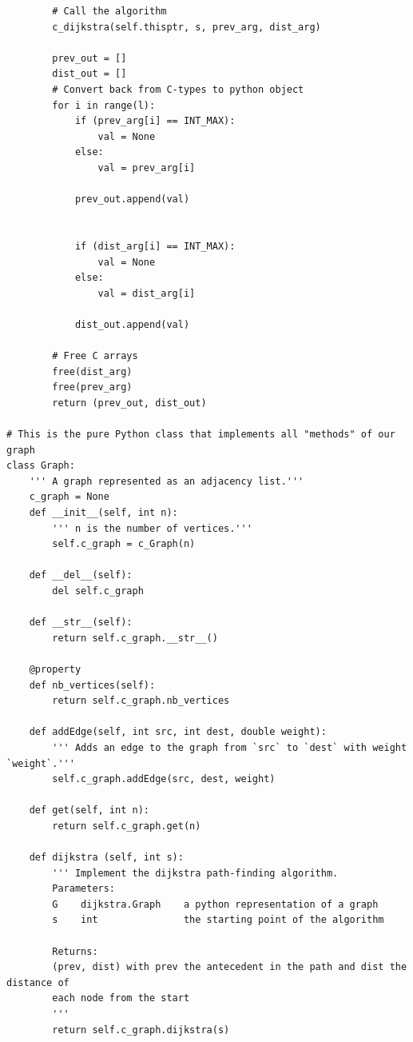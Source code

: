 \documentclass{article}
\begin{document}
\begin{verbatim}
        # Call the algorithm
        c_dijkstra(self.thisptr, s, prev_arg, dist_arg)

        prev_out = []
        dist_out = []
        # Convert back from C-types to python object
        for i in range(l):
            if (prev_arg[i] == INT_MAX):
                val = None
            else:
                val = prev_arg[i]
                
            prev_out.append(val)

            
            if (dist_arg[i] == INT_MAX):
                val = None
            else:
                val = dist_arg[i]
                
            dist_out.append(val)

        # Free C arrays
        free(dist_arg)
        free(prev_arg)
        return (prev_out, dist_out)

# This is the pure Python class that implements all "methods" of our graph
class Graph:
    ''' A graph represented as an adjacency list.'''
    c_graph = None
    def __init__(self, int n):
        ''' n is the number of vertices.'''
        self.c_graph = c_Graph(n)
        
    def __del__(self):
        del self.c_graph
        
    def __str__(self):
        return self.c_graph.__str__()
    
    @property
    def nb_vertices(self):
        return self.c_graph.nb_vertices

    def addEdge(self, int src, int dest, double weight):
        ''' Adds an edge to the graph from `src` to `dest` with weight `weight`.'''
        self.c_graph.addEdge(src, dest, weight)

    def get(self, int n):
        return self.c_graph.get(n)

    def dijkstra (self, int s):
        ''' Implement the dijkstra path-finding algorithm.
        Parameters:
        G    dijkstra.Graph    a python representation of a graph
        s    int               the starting point of the algorithm
    
        Returns:
        (prev, dist) with prev the antecedent in the path and dist the distance of
        each node from the start
        '''
        return self.c_graph.dijkstra(s)
\end{verbatim}

\section*{}
\end{document}
